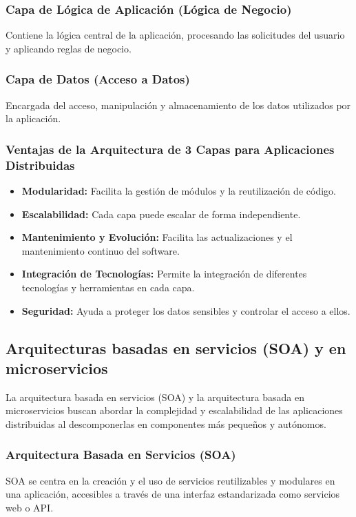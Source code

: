	\subsubsection{Capa de Lógica de Aplicación (Lógica de Negocio)}
	Contiene la lógica central de la aplicación, procesando las solicitudes del usuario y aplicando reglas de negocio.
	
	\subsubsection{Capa de Datos (Acceso a Datos)}
	Encargada del acceso, manipulación y almacenamiento de los datos utilizados por la aplicación.
	
	\subsubsection{Ventajas de la Arquitectura de 3 Capas para Aplicaciones Distribuidas}
	\begin{itemize}
		\item \textbf{Modularidad:} Facilita la gestión de módulos y la reutilización de código.
		\item \textbf{Escalabilidad:} Cada capa puede escalar de forma independiente.
		\item \textbf{Mantenimiento y Evolución:} Facilita las actualizaciones y el mantenimiento continuo del software.
		\item \textbf{Integración de Tecnologías:} Permite la integración de diferentes tecnologías y herramientas en cada capa.
		\item \textbf{Seguridad:} Ayuda a proteger los datos sensibles y controlar el acceso a ellos.
	\end{itemize}
	
	\subsection{Arquitecturas basadas en servicios (SOA) y en microservicios}
	La arquitectura basada en servicios (SOA) y la arquitectura basada en microservicios buscan abordar la complejidad y escalabilidad de las aplicaciones distribuidas al descomponerlas en componentes más pequeños y autónomos.
	
	\subsubsection{Arquitectura Basada en Servicios (SOA)}
	SOA se centra en la creación y el uso de servicios reutilizables y modulares en una aplicación, accesibles a través de una interfaz estandarizada como servicios web o API.
	
